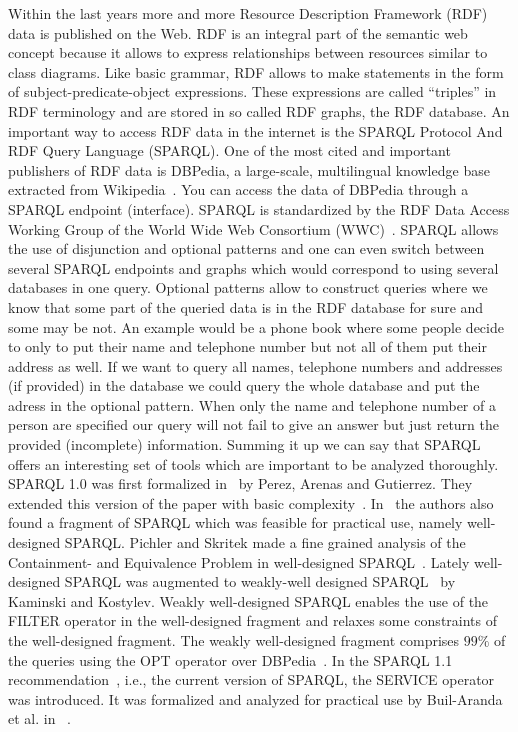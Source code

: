 Within the last years more and more Resource Description Framework
(RDF)~\cite{rdf} data is
published on the Web. RDF is an integral part of the semantic web concept
because it allows to express relationships between resources similar to class
diagrams. Like basic grammar, RDF allows to make statements in the form of subject-predicate-object
expressions. These expressions are called ``triples'' in RDF terminology and are
stored in so called RDF graphs, the RDF database.
An important way to access RDF data in the internet is the SPARQL Protocol And
RDF Query Language (SPARQL). One of the most cited and important publishers of
RDF data is DBPedia, a large-scale, multilingual knowledge base extracted from
Wikipedia~\cite{lehmann2015dbpedia}. You can access the data of DBPedia through
a SPARQL endpoint (interface). 
SPARQL is standardized by the RDF Data Access Working Group of the World Wide
Web Consortium (WWC)~\cite{w3standard}.
SPARQL allows the use of disjunction and optional patterns and one
can even switch between several SPARQL endpoints and graphs which would
correspond to using several
databases in one query\cite{w3standard}. %
Optional patterns allow to construct queries where we know that some part of the
queried data is in the RDF database for sure and some may be not. 
An example would be a phone book where some people decide to
only to put their name and telephone number but not all of them put their
address as well. If we want to query all names, telephone numbers and
addresses (if provided) in the database we could query the whole database and put the adress in the
optional pattern. When only the name and telephone number of a person are
specified our query will not fail to give an answer but just return the provided (incomplete)
information. Summing it up we can say that SPARQL offers an interesting set of
tools which are important to be analyzed thoroughly. 
SPARQL 1.0 was first formalized in~\cite{perez2006semantics} by Perez, Arenas
and Gutierrez. They extended this version of the paper with 
basic complexity~\cite{perez2009semantics}.
In~\cite{perez2009semantics} the authors also found a fragment of SPARQL which
was feasible for practical use, namely well-designed SPARQL. Pichler and Skritek
made a fine grained analysis of the Containment- and Equivalence Problem in
well-designed SPARQL~\cite{pichler2014containment}. Lately well-designed SPARQL was augmented to
weakly-well designed SPARQL~\cite{kaminski_bwd} by Kaminski and
Kostylev. Weakly well-designed SPARQL enables the use of the FILTER operator in the well-designed fragment and
relaxes some constraints of the well-designed fragment. The weakly well-designed
fragment comprises $99\%$ of the queries using the OPT operator over DBPedia~\cite{kaminski_bwd}. 
In the SPARQL 1.1 recommendation~\cite{w3standard}, i.e., the current version of SPARQL, 
the SERVICE operator was introduced. It was formalized and analyzed for
practical use
by Buil-Aranda et al. in ~\cite{BuilAranda20131}.

